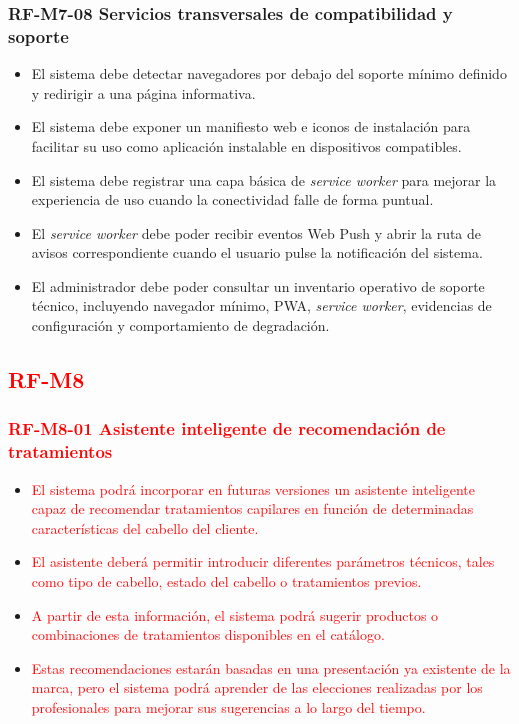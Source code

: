 \subsubsection{RF-M7-08 Servicios transversales de compatibilidad y soporte}
\vspace{-1em}

\begin{itemize}
    \item El sistema debe detectar navegadores por debajo del soporte mínimo definido y redirigir a una página informativa.
    \item El sistema debe exponer un manifiesto web e iconos de instalación para facilitar su uso como aplicación instalable en dispositivos compatibles.
    \item El sistema debe registrar una capa básica de \textit{service worker} para mejorar la experiencia de uso cuando la conectividad falle de forma puntual.
    \item El \textit{service worker} debe poder recibir eventos Web Push y abrir la ruta de avisos correspondiente cuando el usuario pulse la notificación del sistema.
    \item El administrador debe poder consultar un inventario operativo de soporte técnico, incluyendo navegador mínimo, PWA, \textit{service worker}, evidencias de configuración y comportamiento de degradación.
\end{itemize}

\subsection{\textcolor{red}{RF-M8}}

\vspace{-0.75em}
\subsubsection{\textcolor{red}{RF-M8-01 Asistente inteligente de recomendación de tratamientos}}
\vspace{-1em}

\begin{itemize}
    \item \textcolor{red}{El sistema podrá incorporar en futuras versiones un asistente inteligente capaz de recomendar tratamientos capilares en función de determinadas características del cabello del cliente.}
    \item \textcolor{red}{El asistente deberá permitir introducir diferentes parámetros técnicos, tales como tipo de cabello, estado del cabello o tratamientos previos.}
    \item \textcolor{red}{A partir de esta información, el sistema podrá sugerir productos o combinaciones de tratamientos disponibles en el catálogo.}
    \item \textcolor{red}{Estas recomendaciones estarán basadas en una presentación ya existente de la marca, pero el sistema podrá aprender de las elecciones realizadas por los profesionales para mejorar sus sugerencias a lo largo del tiempo.}
\end{itemize}

